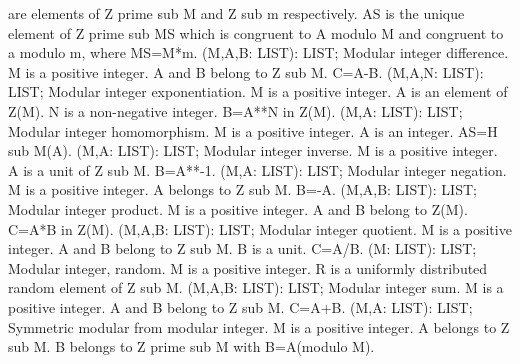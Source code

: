 are elements of Z prime sub M and Z sub m respectively.  AS is the
unique element of Z prime sub MS which is congruent to A modulo M and
congruent to a modulo m, where MS=M*m. \ecom 
{} (M,A,B: LIST): LIST; \eproc
\bcom Modular integer difference. M is a positive integer. A and B
belong to Z sub M. C=A-B. \ecom 
{} (M,A,N: LIST): LIST; \eproc
\bcom Modular integer exponentiation. M is a positive integer. A is an
element of Z(M). N is a non-negative integer. B=A**N in Z(M). \ecom 
{} (M,A: LIST): LIST; \eproc
\bcom Modular integer homomorphism. M is a positive integer. A is an
integer. AS=H sub M(A). \ecom 
{} (M,A: LIST): LIST; \eproc
\bcom Modular integer inverse. M is a positive integer. A is a unit of
Z sub M. B=A**-1. \ecom 
{} (M,A: LIST): LIST; \eproc
\bcom Modular integer negation. M is a positive integer. A belongs to
Z sub M. B=-A. \ecom 
{} (M,A,B: LIST): LIST; \eproc
\bcom Modular integer product. M is a positive integer. A and B belong to
Z(M). C=A*B in Z(M). \ecom 
{} (M,A,B: LIST): LIST; \eproc
\bcom Modular integer quotient. M is a positive integer. A and B belong
to Z sub M. B is a unit. C=A/B. \ecom 
{} (M: LIST): LIST; \eproc
\bcom Modular integer, random. M is a positive integer. R is a uniformly
distributed random element of Z sub M. \ecom 
{} (M,A,B: LIST): LIST; \eproc
\bcom Modular integer sum. M is a positive integer. A and B belong to
Z sub M. C=A+B. \ecom 
{} (M,A: LIST): LIST; \eproc
\bcom Symmetric modular from modular integer. M is a positive integer.
A belongs to Z sub M. B belongs to Z prime sub M with B=A(modulo M). \ecom 
